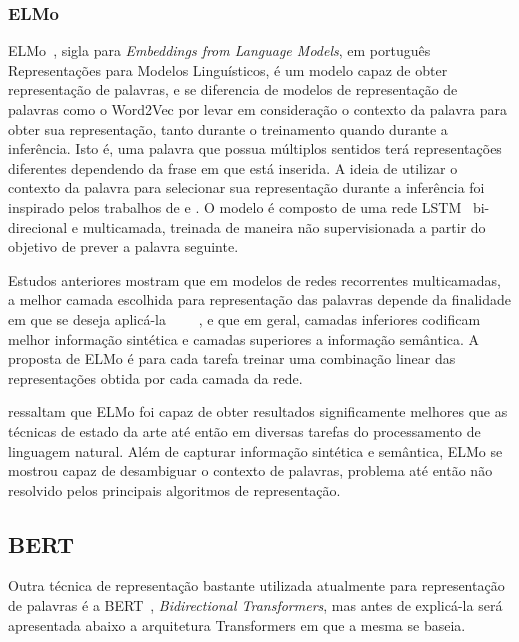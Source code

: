 \subsubsection{ELMo}

ELMo~\cite{peters18}, sigla para \textit{Embeddings from Language Models}, em
português Representações para Modelos Linguísticos, é um modelo capaz de obter
representação de palavras, e se diferencia de modelos de representação de
palavras como o Word2Vec por levar em consideração o contexto da palavra para
obter sua representação, tanto durante o treinamento quando durante a
inferência.
Isto é, uma palavra que possua múltiplos sentidos terá representações diferentes
dependendo da frase em que está inserida.
A ideia de utilizar o contexto da palavra para selecionar sua representação
durante a inferência foi inspirado pelos trabalhos de \citet{peters17} e
\citet{mccann17}.
O modelo é composto de uma rede LSTM~\cite{hochreiter97} bi-direcional e
multicamada, treinada de maneira não supervisionada a partir do objetivo de
prever a palavra seguinte.


Estudos anteriores mostram que em modelos de redes recorrentes multicamadas,
a melhor camada escolhida para representação das palavras depende da finalidade
em que se deseja aplicá-la
~\cite{hashimoto16}~\cite{sogaard16}~\cite{belinkov17}~\cite{melamud16}, e que
em geral, camadas inferiores codificam melhor informação sintética e camadas
superiores a informação semântica.
A proposta de ELMo é para cada tarefa treinar uma combinação linear das
representações obtida por cada camada da rede.

\citet{peters18} ressaltam que ELMo foi capaz de obter resultados significamente
melhores que as técnicas de estado da arte até então em diversas tarefas do
processamento de linguagem natural.
Além de capturar informação sintética e semântica, ELMo se mostrou capaz de
desambiguar o contexto de palavras, problema até então não resolvido pelos
principais algoritmos de representação.

\subsection{BERT}

Outra técnica de representação bastante utilizada atualmente para representação
de palavras é a BERT~\cite{devlin18}, \textit{Bidirectional Transformers}, mas
antes de explicá-la será apresentada abaixo a arquitetura Transformers em que a
mesma se baseia.

